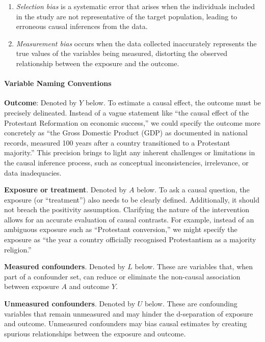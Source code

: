 \documentclass[
  singlecolumn]{article}
\let\oldparagraph\paragraph
\renewcommand{\paragraph}[1]{\oldparagraph{#1}\mbox{}}
\begin{document}
\begin{enumerate}
\def\labelenumi{\alph{enumi}.}
\setcounter{enumi}{1}
\item
  \emph{Selection bias} is a systematic error that arises when the
  individuals included in the study are not representative of the target
  population, leading to erroneous causal inferences from the data.
\item
  \emph{Measurement bias} occurs when the data collected inaccurately
  represents the true values of the variables being measured, distorting
  the observed relationship between the exposure and the outcome.
\end{enumerate}

\hypertarget{variable-naming-conventions}{%
\paragraph{\texorpdfstring{\textbf{Variable Naming
Conventions}}{Variable Naming Conventions}}\label{variable-naming-conventions}}

\textbf{Outcome}: Denoted by \(Y\) below. To estimate a causal effect,
the outcome must be precisely delineated. Instead of a vague statement
like ``the causal effect of the Protestant Reformation on economic
success,'' we could specify the outcome more concretely as ``the Gross
Domestic Product (GDP) as documented in national records, measured 100
years after a country transitioned to a Protestant majority.'' This
precision brings to light any inherent challenges or limitations in the
causal inference process, such as conceptual inconsistencies,
irrelevance, or data inadequacies.

\textbf{Exposure or treatment}. Denoted by \(A\) below. To ask a causal
question, the exposure (or ``treatment'') also needs to be clearly
defined. Additionally, it should not breach the positivity assumption.
Clarifying the nature of the intervention allows for an accurate
evaluation of causal contrasts. For example, instead of an ambiguous
exposure such as ``Protestant conversion,'' we might specify the
exposure as ``the year a country officially recognised Protestantism as
a majority religion.''

\textbf{Measured confounders}. Denoted by \(L\) below. These are
variables that, when part of a confounder set, can reduce or eliminate
the non-causal association between exposure \(A\) and outcome \(Y\).

\textbf{Unmeasured confounders}. Denoted by \(U\) below. These are
confounding variables that remain unmeasured and may hinder the
d-separation of exposure and outcome. Unmeasured confounders may bias
causal estimates by creating spurious relationships between the exposure
and outcome.
\end{document}
